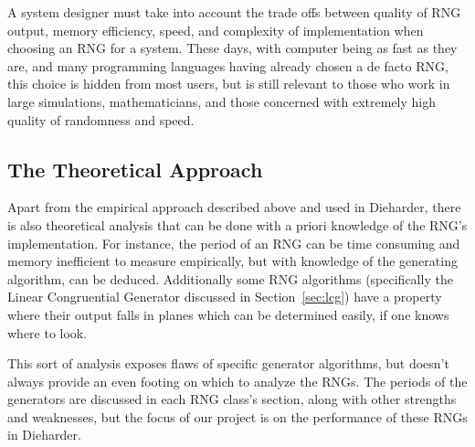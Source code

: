 A system designer must take into account the trade offs between quality of RNG output, memory efficiency, speed, and complexity of implementation when choosing an RNG for a system. These days, with computer being as fast as they are, and many programming languages having already chosen a de facto RNG, this choice is hidden from most users, but is still relevant to those who work in large simulations, mathematicians, and those concerned with extremely high quality of randomness and speed.

\subsection{The Theoretical Approach}
\label{sec:theoretical}

Apart from the empirical approach described above and used in Dieharder, there is also theoretical analysis that can be done with a priori knowledge of the RNG's implementation. For instance, the period of an RNG can be time consuming and memory inefficient to measure empirically, but with knowledge of the generating algorithm, can be deduced. Additionally some RNG algorithms (specifically the Linear Congruential Generator discussed in Section~\ref{sec:lcg}) have a property where their output falls in planes which can be determined easily, if one knows where to look.

This sort of analysis exposes flaws of specific generator algorithms, but doesn't always provide an even footing on which to analyze the RNGs. The periods of the generators are discussed in each RNG class's section, along with other strengths and weaknesses, but the focus of our project is on the performance of these RNGs in Dieharder.
